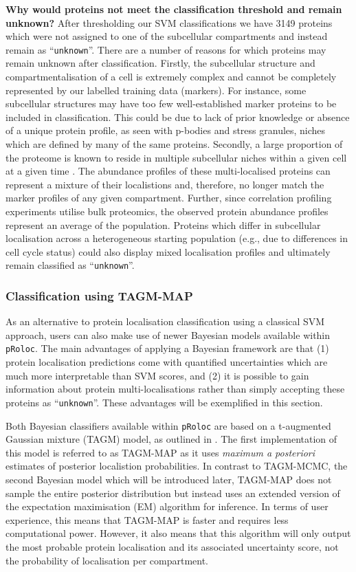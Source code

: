 \documentclass[9pt,a4paper,]{extarticle}
\begin{document}
\textbf{Why would proteins not meet the classification threshold and remain unknown?}
After thresholding our SVM classifications we have
3149 proteins which were
not assigned to one of the subcellular compartments and instead remain as ``\texttt{unknown}''.
There are a number of reasons for which proteins may remain unknown after
classification. Firstly, the subcellular structure and compartmentalisation of a
cell is extremely complex and cannot be completely represented by our labelled
training data (markers). For instance, some subcellular structures may have too
few well-established marker proteins to be included in classification. This could be
due to lack of prior knowledge or absence of a unique protein profile, as seen
with p-bodies and stress granules, niches which are defined by many of the same
proteins. Secondly, a large proportion of the proteome is known to reside in
multiple subcellular niches within a given cell at a given time \citep{Thul2017}. The
abundance profiles of these multi-localised proteins can represent a mixture of
their localistions and, therefore, no longer match the marker profiles of any
given compartment. Further, since correlation profiling experiments utilise bulk
proteomics, the observed protein abundance profiles represent an average of the
population. Proteins which differ in subcellular localisation across a heterogeneous
starting population (e.g., due to differences in cell cycle status) could also
display mixed localisation profiles and ultimately remain classified as ``\texttt{unknown}''.

\subsubsection{Classification using TAGM-MAP}\label{classification-using-tagm-map}

As an alternative to protein localisation classification using a classical SVM
approach, users can also make use of newer Bayesian models available within
\texttt{pRoloc}. The main advantages of applying a Bayesian framework are that (1) protein
localisation predictions come with quantified uncertainties which are much more
interpretable than SVM scores, and (2) it is possible to gain information about
protein multi-localisations rather than simply accepting these proteins as
``\texttt{unknown}''. These advantages will be exemplified in this section.

Both Bayesian classifiers available within \texttt{pRoloc} are based on a t-augmented
Gaussian mixture (TAGM) model, as outlined in \citet{Crook2018}. The first
implementation of this model is referred to as TAGM-MAP as it uses \emph{maximum a
posteriori} estimates of posterior localistion probabilities. In contrast to
TAGM-MCMC, the second Bayesian model which will be introduced later, TAGM-MAP
does not sample the entire posterior distribution but instead uses an extended
version of the expectation maximisation (EM) algorithm for inference. In terms
of user experience, this means that TAGM-MAP is faster and requires less
computational power. However, it also means that this algorithm will only output
the most probable protein localisation and its associated uncertainty score, not
the probability of localisation per compartment.
\end{document}

